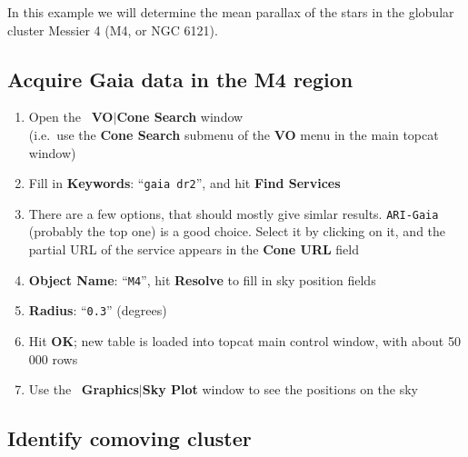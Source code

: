 \documentclass{article}
\newcommand{\buttimg}[1]
           {\mbox{\vtop{\vskip-2ex\hbox{\texttt{[image: \#1]}}}}}
\newcommand{\winfig}[2]
           {\vspace*{-0.5cm}
            \hspace*{0.5cm}\mbox{\vtop{\hbox{\texttt{[image: \#2]}}}}}
\newcommand{\lab}[1]{{\bf #1}}
\newcommand{\mb}[3]{\buttimg{#1}~\lab{#2}$\mid$\lab{#3}}
\newcommand{\entry}[2]{\lab{#1}: ``{\tt #2}''}
\begin{document}
\begin{minipage}[t]{11cm}
In this example we will determine the mean parallax of
the stars in the globular cluster Messier 4 (M4, or NGC 6121).

\subsection{Acquire Gaia data in the M4 region}
\label{sec:m4-cone}

  \raggedright
  \begin{enumerate}
  \item Open the \mb{CONE_DIALOG.png}{VO}{Cone Search} window \\
        (i.e.\ use the \lab{Cone Search} submenu of the \lab{VO} menu
         in the main topcat window)
  \item Fill in \entry{Keywords}{gaia dr2}, and hit \lab{Find Services}
  \item There are a few options, that should mostly give simlar results.
        {\tt ARI-Gaia} (probably the top one) is a good choice.
        Select it by clicking on it, and the
        partial URL of the service appears in the \lab{Cone URL} field
  \item \entry{Object Name}{M4}, hit \lab{Resolve} to fill in
        sky position fields
  \item \entry{Radius}{0.3} (degrees)
  \item Hit \lab{OK};
        new table is loaded into topcat main control window,
        with about 50\,000 rows
  \item Use the \mb{skyplot_button.png}{Graphics}{Sky Plot} window
        to see the positions on the sky
  \end{enumerate}
\end{minipage}
\begin{minipage}[t]{8cm}
  \winfig{width=8cm}{m4_cone.png}
\end{minipage}

\subsection{Identify comoving cluster}
\label{sec:blob}
\end{document}
